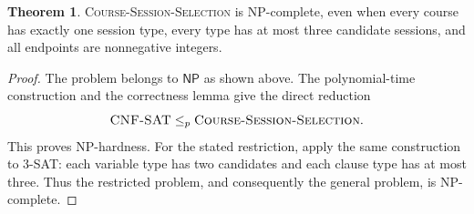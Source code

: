 \documentclass[10pt]{article}
\theoremstyle{definition}
\newtheorem{theorem}[definition]{Theorem}
\newcommand{\NP}{\mathsf{NP}}
\begin{document}
\begin{theorem}
\textsc{Course-Session-Selection} is NP-complete, even when every
course has exactly one session type, every type has at most three
candidate sessions, and all endpoints are nonnegative integers.
\end{theorem}

\begin{proof}
The problem belongs to $\NP$ as shown above. The polynomial-time
construction and the correctness lemma give the direct reduction
\[
  \textsc{CNF-SAT}\leq_p\textsc{Course-Session-Selection}.
\]
This proves NP-hardness. For the stated restriction, apply the same
construction to \textsc{3-SAT}: each variable type has two candidates
and each clause type has at most three. Thus the restricted problem,
and consequently the general problem, is NP-complete.
\end{proof}
\end{document}
